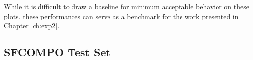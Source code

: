 While it is difficult to draw a baseline for minimum acceptable behavior on
these plots, these performances can serve as a benchmark for the work presented
in Chapter \ref{ch:exp2}. 



\subsection{SFCOMPO Test Set}
\label{sec:sfcompo}

